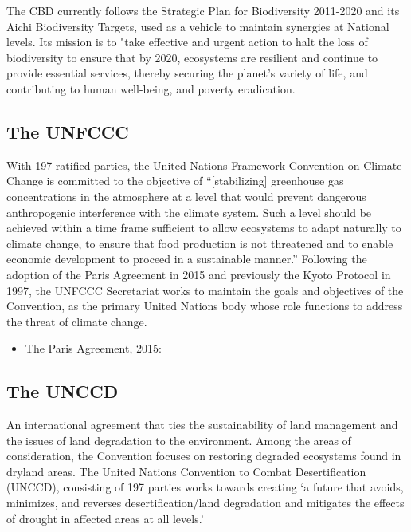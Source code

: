\documentclass[
  openany]{book}
\providecommand{\tightlist}{%
  \setlength{\itemsep}{0pt}\setlength{\parskip}{0pt}}
\begin{document}
The CBD currently follows the Strategic Plan for Biodiversity 2011-2020 and its Aichi Biodiversity Targets, used as a vehicle to maintain synergies at National levels. Its mission is to "take effective and urgent action to halt the loss of biodiversity to ensure that by 2020, ecosystems are resilient and continue to provide essential services, thereby securing the planet's variety of life, and contributing to human well-being, and poverty eradication.

\hypertarget{the-unfccc}{%
\subsection{The UNFCCC}\label{the-unfccc}}

With 197 ratified parties, the United Nations Framework Convention on Climate Change is committed to the objective of ``{[}stabilizing{]} greenhouse gas concentrations in the atmosphere at a level that would prevent dangerous anthropogenic interference with the climate system. Such a level should be achieved within a time frame sufficient to allow ecosystems to adapt naturally to climate change, to ensure that food production is not threatened and to enable economic development to proceed in a sustainable manner.'' Following the adoption of the Paris Agreement in 2015 and previously the Kyoto Protocol in 1997, the UNFCCC Secretariat works to maintain the goals and objectives of the Convention, as the primary United Nations body whose role functions to address the threat of climate change.

\begin{itemize}
\tightlist
\item
  The Paris Agreement, 2015:
\end{itemize}

\hypertarget{the-unccd}{%
\subsection{The UNCCD}\label{the-unccd}}

An international agreement that ties the sustainability of land management and the issues of land degradation to the environment. Among the areas of consideration, the Convention focuses on restoring degraded ecosystems found in dryland areas. The United Nations Convention to Combat Desertification (UNCCD), consisting of 197 parties works towards creating `a future that avoids, minimizes, and reverses desertification/land degradation and mitigates the effects of drought in affected areas at all levels.'
\end{document}
